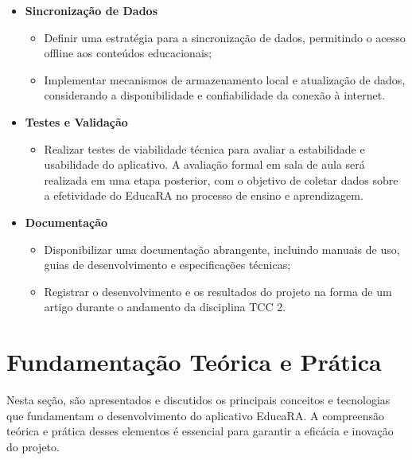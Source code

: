 \documentclass[12pt]{article}
\begin{document}
\begin{itemize}
\item \textbf{Sincronização de Dados}

\begin{itemize}
    \item Definir uma estratégia para a sincronização de dados, permitindo o acesso offline aos conteúdos educacionais;
    \item Implementar mecanismos de armazenamento local e atualização de dados, considerando a disponibilidade e confiabilidade da conexão à internet.
\end{itemize}
\end{itemize}

\begin{itemize}
\item \textbf{Testes e Validação}

\begin{itemize}
    \item Realizar testes de viabilidade técnica para avaliar a estabilidade e usabilidade do aplicativo. A avaliação formal em sala de aula será realizada em uma etapa posterior, com o objetivo de coletar dados sobre a efetividade do EducaRA no processo de ensino e aprendizagem.
\end{itemize}
\end{itemize}

\begin{itemize} 
\item \textbf{Documentação}

\begin{itemize}
    \item Disponibilizar uma documentação abrangente, incluindo manuais de uso, guias de desenvolvimento e especificações técnicas;
    \item Registrar o desenvolvimento e os resultados do projeto na forma de um artigo durante o andamento da disciplina TCC 2.
\end{itemize}
\end{itemize}

\section{Fundamentação Teórica e Prática}\label{sec:fundamentacao-teorica}

Nesta seção, são apresentados e discutidos os principais conceitos e tecnologias que fundamentam o desenvolvimento do aplicativo EducaRA. A compreensão teórica e prática desses elementos é essencial para garantir a eficácia e inovação do projeto.
\end{document}
